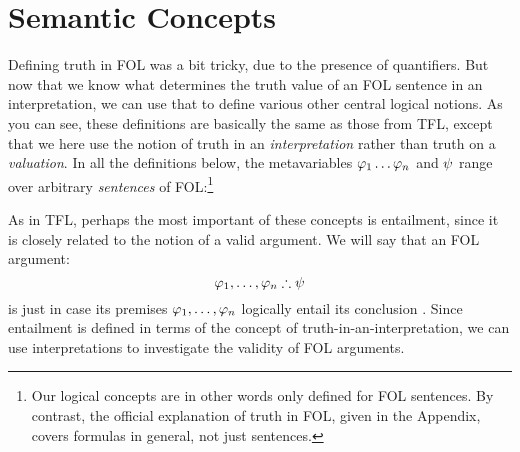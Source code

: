 \section{Semantic Concepts}\label{s:FOLSemanticConcepts}

Defining truth in FOL was a bit tricky, due to the presence of quantifiers. But now that we know what determines the truth value of an FOL sentence in an interpretation, we can use that to define various other central logical notions.   As you can see, these definitions are basically the same as those from TFL, except that we here use the notion of truth in an \emph{interpretation} rather than truth on a \emph{valuation}.  In all the definitions below, the metavariables $\mathcal{\varphi}_1 \ldots \mathcal{\varphi}_n$ and $\mathcal{\psi}$ range over arbitrary \emph{sentences} of FOL:\footnote{Our logical concepts are in other words only defined for FOL sentences.  By contrast, the official explanation of truth in FOL, given in the Appendix, covers formulas in general, not just sentences.}


As in TFL, perhaps the most important of these concepts is  entailment, since it is closely related to the notion of a valid argument.  We will say that an FOL argument:
$$\mathcal{\varphi}_1, \ldots, \mathcal{\varphi}_n \therefore \mathcal{\psi}$$
is  just in case its premises $\mathcal{\varphi}_1, \ldots, \mathcal{\varphi}_n$ logically entail its conclusion \meta{\psi}.  Since entailment is defined in terms of the concept of truth-in-an-interpretation, we can use interpretations to investigate the validity of FOL arguments.

